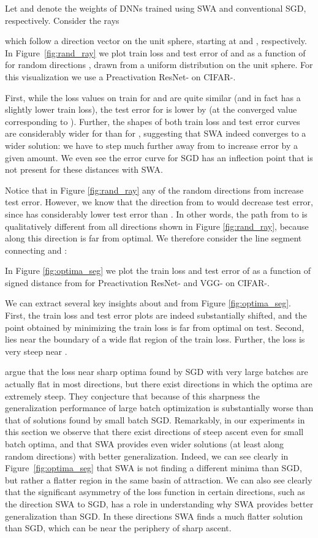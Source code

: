 \documentclass[letterpaper]{article}
\begin{document}
Let  and  denote the weights of DNNs trained 
using SWA and conventional SGD, respectively. 
Consider the rays 

which follow a direction vector  on the unit sphere,
starting at  and , respectively. In Figure~\ref{fig:rand_ray} 
we plot train loss and test error of  and
 as a function of  for  random directions ,
 drawn from a uniform distribution on the unit sphere. 
For this visualization we use a Preactivation ResNet- on CIFAR-.

First, while the loss values on train for  and 
are quite similar (and in fact  has a slightly lower train loss),
the test error for  is lower by  (at the converged value
corresponding to ).
Further, the shapes of both train loss and test error curves
are considerably wider for  than for , suggesting
that SWA indeed converges to a wider solution: we have to step much further away
from  to increase error by a given amount. 
We even see the error curve for SGD has an inflection point that is not present for 
these distances with SWA.

Notice that in Figure \ref{fig:rand_ray} any of the random directions from 
increase test error.
However, we know that the direction from  to  would 
decrease test error,
since  has considerably lower test error than .
In other words, the path from  to  is qualitatively 
different from all directions shown in Figure \ref{fig:rand_ray}, because
along this direction  is far from optimal.
We therefore consider the line segment connecting 
  and :

In Figure \ref{fig:optima_seg} we plot the train loss
and test error of  as a function of signed distance from  for 
Preactivation ResNet- and VGG- on CIFAR-. 

We can extract several key insights about  and  from 
Figure \ref{fig:optima_seg}. First, the train loss and test error plots are 
indeed substantially shifted, and the point obtained by minimizing the train
loss is far from optimal on test. Second,  lies near the boundary
of a wide flat region of the train loss. Further, the loss is very steep near
. 

\citet{keskar2017large} argue that the loss near sharp optima found by SGD with very
large batches are actually flat in most directions, but there
exist directions in which the optima are extremely steep. They conjecture that
because of this sharpness the generalization performance of large batch optimization
is substantially worse than that of solutions found by small batch SGD.
Remarkably, in our experiments in this section we observe that there exist directions of steep 
ascent even for small batch optima, and that SWA provides even wider solutions 
(at least along random directions) with better generalization. Indeed, we can see clearly in 
Figure~\ref{fig:optima_seg} that SWA is not finding a different minima than SGD, but rather
a flatter region in the same basin of attraction. We can also see clearly that the significant 
asymmetry of the loss function in certain directions, such as the direction SWA to SGD, has a role in 
understanding why SWA provides better generalization than SGD. In these directions SWA
finds a much flatter solution than SGD, which can be near the periphery of sharp ascent.
\end{document}
